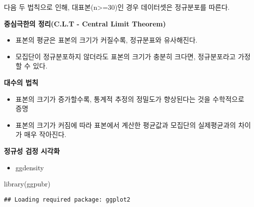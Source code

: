 \documentclass[
]{article}
\newenvironment{Shaded}{\begin{snugshade}}{\end{snugshade}}
\newcommand{\AttributeTok}[1]{\textcolor[rgb]{0.77,0.63,0.00}{#1}}
\newcommand{\DecValTok}[1]{\textcolor[rgb]{0.00,0.00,0.81}{#1}}
\newcommand{\FunctionTok}[1]{\textcolor[rgb]{0.00,0.00,0.00}{#1}}
\newcommand{\NormalTok}[1]{#1}
\newcommand{\SpecialCharTok}[1]{\textcolor[rgb]{0.00,0.00,0.00}{#1}}
\newcommand{\StringTok}[1]{\textcolor[rgb]{0.31,0.60,0.02}{#1}}
\providecommand{\tightlist}{%
  \setlength{\itemsep}{0pt}\setlength{\parskip}{0pt}}
\begin{document}
다음 두 법칙으로 인해, 대표본(n\textgreater=30)인 경우 데이터셋은 정규분포를 따른다.

\textbf{중심극한의 정리(C.L.T - Central Limit Theorem)}

\begin{itemize}
\item
  표본의 평균은 표본의 크기가 커질수록, 정규분표와 유사해진다.
\item
  모집단이 정규분포하지 않더라도 표본의 크기가 충분히 크다면, 정규분포라고 가정할 수 있다.
\end{itemize}

\textbf{대수의 법칙}

\begin{itemize}
\item
  표본의 크기가 증가할수록, 통계적 추정의 정밀도가 향상된다는 것을 수학적으로 증명
\item
  표본의 크기가 커짐에 따라 표본에서 계산한 평균값과 모집단의 실제평균과의 차이가 매우 작아진다.
\end{itemize}

\textbf{정규성 검정 시각화}

\begin{itemize}
\tightlist
\item
  ggdensity
\end{itemize}

\begin{Shaded}
\begin{Highlighting}[]
\FunctionTok{library}\NormalTok{(ggpubr)}
\end{Highlighting}
\end{Shaded}

\begin{verbatim}
## Loading required package: ggplot2
\end{verbatim}

\begin{Shaded}
\end{Shaded}
\end{document}
